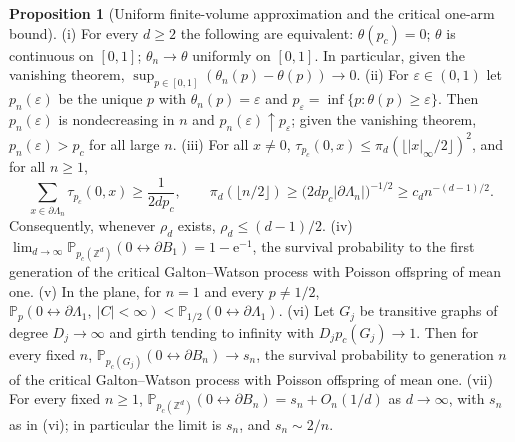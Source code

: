 \documentclass[11pt]{article}
\theoremstyle{definition}
\newcommand{\e}{\mathrm{e}}
\newcommand{\Pp}{\mathbb P}
\newcommand{\Z}{\mathbb Z}
\newcommand{\eps}{\varepsilon}
\providecommand{\Z}{\mathbb Z}
\providecommand{\Pp}{\mathbb P}
\newtheorem{proposition}{Proposition}
\begin{document}
\begin{proposition}[Uniform finite-volume approximation and the critical one-arm bound]\label{av:basic}
{\rm(i)} For every $d\ge2$ the following are equivalent: $\theta(p_c)=0$;
$\theta$ is continuous on $[0,1]$; $\theta_n\to\theta$ uniformly on
$[0,1]$.  In particular, given the vanishing theorem,
$\sup_{p\in[0,1]}(\theta_n(p)-\theta(p))\to0$.
{\rm(ii)} For $\eps\in(0,1)$ let $p_n(\eps)$ be the unique $p$ with
$\theta_n(p)=\eps$ and $p_\eps=\inf\{p:\theta(p)\ge\eps\}$.  Then
$p_n(\eps)$ is nondecreasing in $n$ and $p_n(\eps)\uparrow p_\eps$;
given the vanishing theorem, $p_n(\eps)>p_c$ for all large $n$.
{\rm(iii)} For all $x\ne0$, $\tau_{p_c}(0,x)\le\pi_d(\lfloor|x|_\infty/2\rfloor)^2$,
and for all $n\ge1$,
\[
 \sum_{x\in\partial\Lambda_n}\tau_{p_c}(0,x)\ge\frac1{2dp_c},\qquad
 \pi_d(\lfloor n/2\rfloor)\ge\bigl(2dp_c|\partial\Lambda_n|\bigr)^{-1/2}\ge c_dn^{-(d-1)/2}.
\]
Consequently, whenever $\rho_d$ exists, $\rho_d\le(d-1)/2$.
{\rm(iv)} $\lim_{d\to\infty}\Pp_{p_c(\Z^d)}(0\leftrightarrow\partial B_1)=1-\e^{-1}$,
the survival probability to the first generation of the critical
Galton--Watson process with Poisson offspring of mean one.
{\rm(v)} In the plane, for $n=1$ and every $p\ne1/2$,
$\Pp_p(0\leftrightarrow\partial\Lambda_1,\ |C|<\infty)<\Pp_{1/2}(0\leftrightarrow\partial\Lambda_1)$.
{\rm(vi)} Let $G_j$ be transitive graphs of degree $D_j\to\infty$ and girth
tending to infinity with $D_jp_c(G_j)\to1$.  Then for every fixed $n$,
$\Pp_{p_c(G_j)}(0\leftrightarrow\partial B_n)\to s_n$, the survival
probability to generation $n$ of the critical Galton--Watson process with
Poisson offspring of mean one.
{\rm(vii)} For every fixed $n\ge1$,
$\Pp_{p_c(\Z^d)}(0\leftrightarrow\partial B_n)=s_n+O_n(1/d)$ as $d\to\infty$,
with $s_n$ as in {\rm(vi)}; in particular the limit is $s_n$, and
$s_n\sim2/n$.
\end{proposition}
\end{document}
